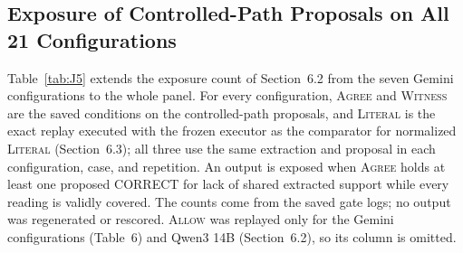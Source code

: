 \documentclass[acmsmall,review]{acmart}
\newcommand{\agree}{\textsc{Agree}}
\newcommand{\allow}{\textsc{Allow}}
\newcommand{\literal}{\textsc{Literal}}
\newcommand{\witness}{\textsc{Witness}}
\begin{document}
\subsection{Exposure of Controlled-Path Proposals on All 21 Configurations}
Table~\ref{tab:J5} extends the exposure count of Section~6.2 from the seven Gemini configurations to the whole panel. For every configuration, \agree{} and \witness{} are the saved conditions on the controlled-path proposals, and \literal{} is the exact replay executed with the frozen executor as the comparator for normalized \literal{} (Section~6.3); all three use the same extraction and proposal in each configuration, case, and repetition. An output is exposed when \agree{} holds at least one proposed CORRECT for lack of shared extracted support while every reading is validly covered. The counts come from the saved gate logs; no output was regenerated or rescored. \allow{} was replayed only for the Gemini configurations (Table~6) and Qwen3 14B (Section~6.2), so its column is omitted.
\end{document}
